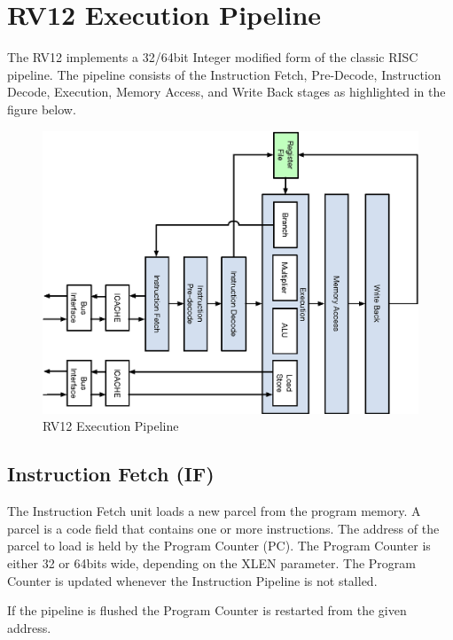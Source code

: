 \chapter{RV12 Execution Pipeline}

The RV12 implements a 32/64bit Integer modified form of the classic RISC pipeline.
The pipeline consists of the Instruction Fetch, Pre-Decode, Instruction Decode, Execution, Memory Access, and Write Back stages as highlighted in the figure below.


\begin{figure}[!htb]
  \includegraphics{assets/img/Pipeline-Overview}
  \caption{RV12 Execution Pipeline}
\end{figure}

\pagebreak

\section{Instruction Fetch (IF)}\label{instr-fetch-if}

The Instruction Fetch unit loads a new parcel from the program memory.
A parcel is a code field that contains one or more instructions.
The address of the parcel to load is held by the Program Counter (PC).
The Program Counter is either 32 or 64bits wide, depending on the XLEN parameter.
The Program Counter is updated whenever the Instruction Pipeline is not stalled.

If the pipeline is flushed the Program Counter is restarted from the given address.

